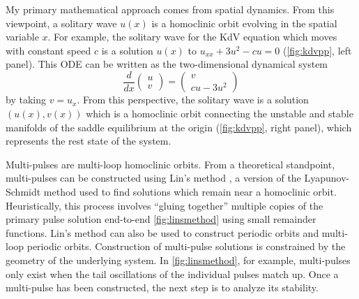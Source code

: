 \documentclass[12pt,reqno,oneside,hidelinks]{article}
\begin{document}
My primary mathematical approach comes from spatial dynamics. From this viewpoint, a solitary wave $u(x)$ is a homoclinic orbit evolving in the spatial variable $x$. For example, the solitary wave for the KdV equation which moves with constant speed $c$ is a solution $u(x)$ to $u_{xx} + 3 u^2 - c u = 0$ (\cref{fig:kdvpp}, left panel). This ODE can be written as the two-dimensional dynamical system 
\[
\frac{d}{dx}\begin{pmatrix}u\\v\end{pmatrix}
= \begin{pmatrix}v \\ cu - 3u^2\end{pmatrix}
\]
by taking $v = u_x$. From this perspective, the solitary wave is a solution $(u(x), v(x))$ which is a homoclinic orbit connecting the unstable and stable manifolds of the saddle equilibrium at the origin (\cref{fig:kdvpp}, right panel), which represents the rest state of the system. 

Multi-pulses are multi-loop homoclinic orbits. From a theoretical standpoint, multi-pulses can be constructed using Lin's method \cite{Lin2008}, a version of the Lyapunov-Schmidt method used to find solutions which remain near a homoclinic orbit. Heuristically, this process involves ``gluing together'' multiple copies of the primary pulse solution end-to-end \cref{fig:linsmethod} using small remainder functions. Lin's method can also be used to construct periodic orbits and multi-loop periodic orbits. Construction of multi-pulse solutions is constrained by the geometry of the underlying system. In \cref{fig:linsmethod}, for example, multi-pulses only exist when the tail oscillations of the individual pulses match up. Once a multi-pulse has been constructed, the next step is to analyze its stability.
\end{document}

